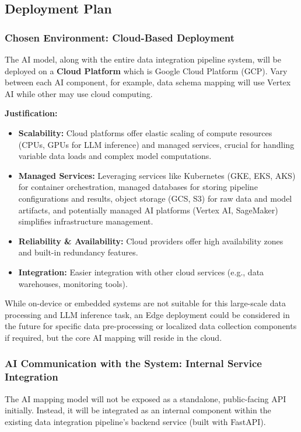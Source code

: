 \subsection{Deployment Plan}

\subsubsection{Chosen Environment: Cloud-Based Deployment}
The AI model, along with the entire data integration pipeline system, will be deployed on a \textbf{Cloud Platform} which is Google Cloud Platform (GCP). Vary between each AI component, for example, data schema mapping will use Vertex AI while other may use cloud computing.

\textbf{Justification:}
\begin{itemize}
    \item \textbf{Scalability:} Cloud platforms offer elastic scaling of compute resources (CPUs, GPUs for LLM inference) and managed services, crucial for handling variable data loads and complex model computations.
    \item \textbf{Managed Services:} Leveraging services like Kubernetes (GKE, EKS, AKS) for container orchestration, managed databases for storing pipeline configurations and results, object storage (GCS, S3) for raw data and model artifacts, and potentially managed AI platforms (Vertex AI, SageMaker) simplifies infrastructure management.
    \item \textbf{Reliability \& Availability:} Cloud providers offer high availability zones and built-in redundancy features.
    \item \textbf{Integration:} Easier integration with other cloud services (e.g., data warehouses, monitoring tools).
\end{itemize}
While on-device or embedded systems are not suitable for this large-scale data processing and LLM inference task, an Edge deployment could be considered in the future for specific data pre-processing or localized data collection components if required, but the core AI mapping will reside in the cloud.

\subsubsection{AI Communication with the System: Internal Service Integration}
The AI mapping model will not be exposed as a standalone, public-facing API initially. Instead, it will be integrated as an internal component within the existing data integration pipeline's backend service (built with FastAPI).

